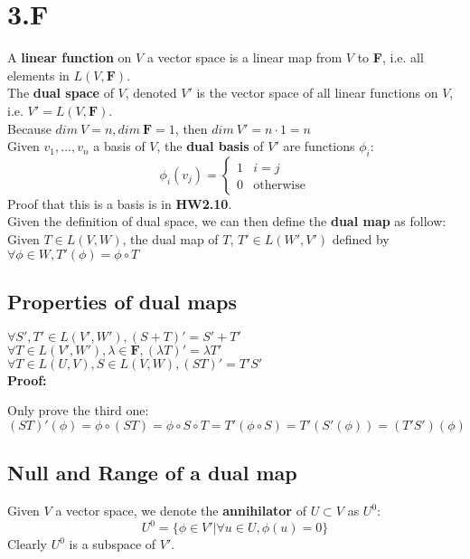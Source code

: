 \documentclass{article}
\begin{document}
\section{3.F}
A \textbf{linear function} on $V$ a vector space is a linear map from $V$ to \textbf{F}, i.e. all elements in $L(V, \mathbf{F})$.\\
The \textbf{dual space} of $V$, denoted $V'$ is the vector space of all linear functions on $V$, i.e. $V' = L(V, \mathbf{F})$.\\
Because $dim\ V = n, dim\ \mathbf{F} = 1$, then $dim\ V' = n \cdot 1 = n$\\
Given $v_1, ..., v_n$ a basis of $V$, the \textbf{dual basis} of $V'$ are functions $\phi_i$:
\begin{equation*}
    \phi_i(v_j) = \begin{cases}
    1 & i = j\\
    0 &\textrm{otherwise}
    \end{cases}
\end{equation*}
Proof that this is a basis is in \textbf{HW2.10}.\\
Given the definition of dual space, we can then define the \textbf{dual map} as follow:\\
Given $T \in L(V,W)$, the dual map of $T$, $T' \in L(W', V')$ defined by $\forall \phi \in W, T'(\phi) = \phi \circ T$
\subsection{Properties of dual maps}
$\forall S', T' \in L(V', W'), (S+T)' = S' + T'$\\
$\forall T \in L(V', W'), \lambda \in \textbf{F}, (\lambda T)' = \lambda T'$\\
$\forall T \in L(U, V), S \in L(V, W), (ST)' = T'S'$\\
\textbf{Proof:}
\begin{addmargin}[1em]{0em}
Only prove the third one:\\
$(ST)'(\phi) = \phi \circ (ST) = \phi \circ S \circ T = T'(\phi \circ S) = T'(S'(\phi)) = (T'S')(\phi)$
\end{addmargin}
\subsection{Null and Range of a dual map}
Given $V$ a vector space, we denote the \textbf{annihilator} of $U \subset V$ as $U^0$:
\begin{equation*}
    U^0 = \{\phi \in V'|\forall u \in U, \phi(u) = 0\}
\end{equation*}
Clearly $U^0$ is a subspace of $V'$.\\
\end{document}
